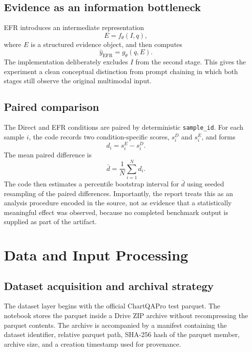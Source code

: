 \documentclass[11pt,a4paper]{article}
\newcommand{\code}[1]{\texttt{#1}}
\begin{document}
\subsection{Evidence as an information bottleneck}
EFR introduces an intermediate representation
\begin{equation}
E = f_{\theta}(I,q),
\end{equation}
where \(E\) is a structured evidence object, and then computes
\begin{equation}
\hat{y}_{\mathrm{EFR}} = g_{\theta}(q,E).
\end{equation}
The implementation deliberately excludes \(I\) from the second stage. This gives the experiment a clean conceptual distinction from prompt chaining in which both stages still observe the original multimodal input.

\subsection{Paired comparison}
The Direct and EFR conditions are paired by deterministic \code{sample\_id}. For each sample \(i\), the code records two condition-specific scores, \(s_i^{D}\) and \(s_i^{E}\), and forms
\begin{equation}
d_i = s_i^{E} - s_i^{D}.
\end{equation}
The mean paired difference is
\begin{equation}
\bar{d} = \frac{1}{N}\sum_{i=1}^{N} d_i.
\end{equation}
The code then estimates a percentile bootstrap interval for \(\bar{d}\) using seeded resampling of the paired differences. Importantly, the report treats this as an analysis procedure encoded in the source, not as evidence that a statistically meaningful effect was observed, because no completed benchmark output is supplied as part of the artifact.

\section{Data and Input Processing}
\subsection{Dataset acquisition and archival strategy}
The dataset layer begins with the official ChartQAPro test parquet. The notebook stores the parquet inside a Drive ZIP archive without recompressing the parquet contents. The archive is accompanied by a manifest containing the dataset identifier, relative parquet path, SHA-256 hash of the parquet member, archive size, and a creation timestamp used for provenance.
\end{document}
